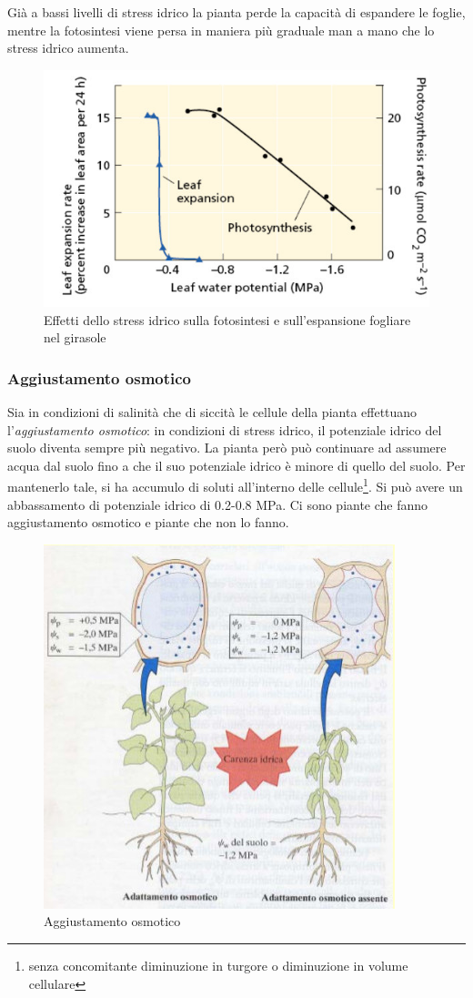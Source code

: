 \documentclass[a4paper,12pt]{book}
\begin{document}
Già a bassi livelli di stress idrico la pianta perde la capacità di espandere le foglie, mentre la fotosintesi viene persa in maniera più graduale man a mano che lo stress idrico aumenta.
\begin{figure}[H]
\centering
\includegraphics[scale=.4]{immagini/stress.jpg}
\caption{Effetti dello stress idrico sulla fotosintesi e sull'espansione fogliare nel girasole}
\end{figure}
\subsubsection{Aggiustamento osmotico}
Sia in condizioni di salinità che di siccità le cellule della pianta effettuano l'\emph{aggiustamento osmotico}: in condizioni di stress idrico, il potenziale idrico del suolo diventa sempre più negativo. La pianta però può continuare ad assumere acqua dal suolo fino a che il suo potenziale idrico è minore di quello del suolo. Per mantenerlo tale, si ha accumulo di soluti all'interno delle cellule\footnote{senza concomitante diminuzione
in turgore o diminuzione in volume cellulare}. Si può avere un abbassamento di potenziale idrico di 0.2-0.8 MPa. Ci sono piante che fanno aggiustamento osmotico e piante che non lo fanno.
\begin{figure}[H]
\centering
\includegraphics[scale=.4]{immagini/aggiustamento.jpg}
\caption{Aggiustamento osmotico}
\end{figure}
\end{document}
